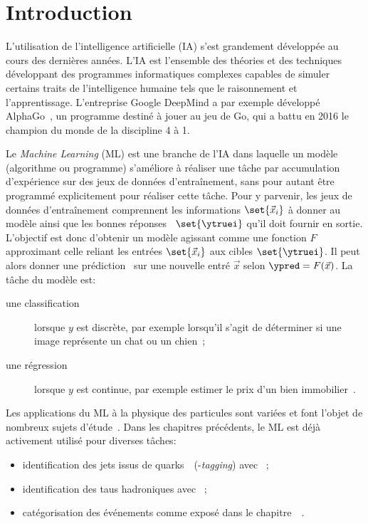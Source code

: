 \section{Introduction}\label{chapter-ML-section-intro}
L'utilisation de l'intelligence artificielle (IA) s'est grandement développée au cours des dernières années.
L'IA est l'ensemble des théories et des techniques développant des programmes informatiques complexes capables de simuler certains traits de l'intelligence humaine tels que le raisonnement et l'apprentissage.
L'entreprise Google DeepMind a par exemple développé AlphaGo~\cite{alphago},
un programme destiné à jouer au jeu de Go,
qui a battu en 2016 le champion du monde de la discipline 4 à 1.
\par
Le \emph{Machine Learning} (ML) est une branche de l'IA
dans laquelle un modèle (algorithme ou programme) s'améliore à réaliser une tâche par
accumulation d'expérience sur des jeux de données d'entraînement,
sans pour autant être programmé explicitement pour réaliser cette tâche.
Pour y parvenir,
les jeux de données d'entraînement comprennent les informations $\set{\vec{x}_i}$ à donner au modèle
ainsi que les \og bonnes réponses \fg\ $\set{\ytruei}$ qu'il doit fournir en sortie.
L'objectif est donc d'obtenir un modèle agissant comme une fonction $F$ approximant celle reliant les entrées $\set{\vec{x}_i}$ aux cibles $\set{\ytruei}$.
Il peut alors donner une prédiction \ypred\ sur une nouvelle entré $\vec{x}$ selon $\ypred=F(\vec{x})$.
La tâche du modèle est:
\begin{description}
\item[une classification] lorsque $y$ est discrète, par exemple lorsqu'il s'agit de déterminer si une image représente un chat ou un chien~\cite{datafrog_img_reco};
\item[une régression] lorsque $y$ est continue, par exemple estimer le prix d'un bien immobilier~\cite{house_prices_regression}.
\end{description}
\par
Les applications du ML à la physique des particules sont variées et font l'objet de nombreux sujets d'étude~\cite{Gael_thesis,scham_moritz_2020_21993,kopf_tanja_2019_21500,Baldi_2015}.
Dans les chapitres précédents, le ML est déjà activement utilisé pour diverses tâches:
\begin{itemize}
\item identification des jets issus de quarks~\quarkb\ (\quarkb-\emph{tagging}) avec \DeepCSV~\cite{jet_flavor_deep_nn,Sirunyan_heavy_flavor_jets_2018,DeepJet};
\item identification des taus hadroniques avec \DEEPTAU~\cite{CMS-DP-2019-033};
\item catégorisation des événements comme exposé dans le chapitre~~\cite{CMS-NOTE-2019-177,CMS-NOTE-2019-178}.
\end{itemize}
